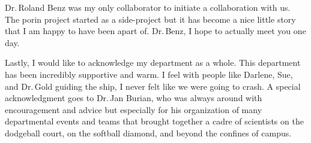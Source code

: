 Dr.\,Roland Benz was my only collaborator to initiate a collaboration with us. The porin project started as a side-project but it has become a nice little story that I am happy to have been apart of. Dr.\,Benz, I hope to actually meet you one day.

Lastly, I would like to acknowledge my department as a whole. This department has been incredibly supportive and warm. I feel with people like Darlene, Sue, and Dr.\,Gold guiding the ship, I never felt like we were going to crash. A special acknowledgment goes to Dr.\,Jan Burian, who was always around with encouragement and advice but especially for his organization of many departmental events and teams that brought together a cadre of scientists on the dodgeball court, on the softball diamond, and beyond the confines of campus.

